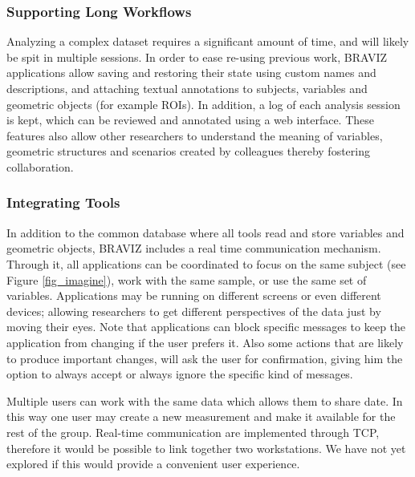 \documentclass[twocolumn]{svjour3}
\begin{document}
\subsubsection{Supporting Long Workflows}

Analyzing a complex dataset requires a significant amount of time, and will likely be spit in multiple sessions. In order to ease re-using previous work, BRAVIZ applications allow saving and restoring their state using custom names and descriptions, and attaching textual annotations to subjects, variables and geometric objects (for example ROIs). In addition, a log of each analysis session is kept, which can be reviewed and annotated using a web interface. These features also allow other researchers to understand the meaning of variables, geometric structures and scenarios created by colleagues thereby fostering collaboration. 

\subsubsection{Integrating Tools}

In addition to the common database where all tools read and store variables and geometric objects, BRAVIZ includes a real time communication mechanism. Through it, all applications can be coordinated to focus on the same subject (see Figure \ref{fig_imagine}), work with the same sample, or use the same set of variables. Applications may be running on different screens or even different devices; allowing researchers to get different perspectives of the data just by moving their eyes. Note that applications can block specific messages to keep the application from changing if the user prefers it. Also some actions that are likely to produce important changes, will ask the user for confirmation, giving him the option to always accept or always ignore the specific kind of messages.

Multiple users can work with the same data  which allows them to share date. In this way one user may create a new measurement and make it available for the rest of the group. Real-time communication are implemented through TCP, therefore it would be possible to link together two workstations. We have not yet explored if this would provide a convenient user experience.
\end{document}
